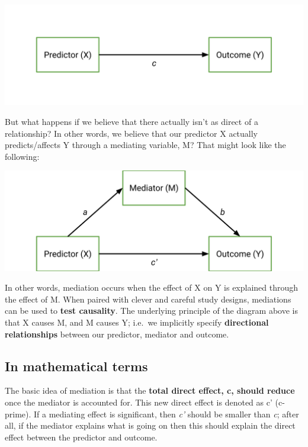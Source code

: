 \documentclass[
]{book}
\begin{document}
\begin{center}\includegraphics{img/mediation_1} \end{center}

But what happens if we believe that there actually isn't as direct of a relationship? In other words, we believe that our predictor X actually predicts/affects Y through a mediating variable, M? That might look like the following:

\begin{center}\includegraphics{img/mediation_2} \end{center}

In other words, mediation occurs when the effect of X on Y is explained through the effect of M. When paired with clever and careful study designs, mediations can be used to \textbf{test causality}. The underlying principle of the diagram above is that X causes M, and M causes Y; i.e.~we implicitly specify \textbf{directional relationships} between our predictor, mediator and outcome.

\subsection{In mathematical terms}\label{in-mathematical-terms}

The basic idea of mediation is that the \textbf{total direct effect, c, should reduce} once the mediator is accounted for. This new direct effect is denoted as c' (c-prime). If a mediating effect is significant, then \emph{c'} should be smaller than \emph{c}; after all, if the mediator explains what is going on then this should explain the direct effect between the predictor and outcome.
\end{document}

